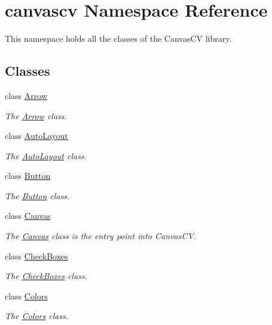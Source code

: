 \hypertarget{namespacecanvascv}{}\section{canvascv Namespace Reference}
\label{namespacecanvascv}


This namespace holds all the classes of the Canvas\+CV library.  


\subsection*{Classes}
\begin{DoxyCompactItemize}
\item 
class \hyperlink{classcanvascv_1_1Arrow}{Arrow}
\begin{DoxyCompactList}\small\item\em The \hyperlink{classcanvascv_1_1Arrow}{Arrow} class. \end{DoxyCompactList}\item 
class \hyperlink{classcanvascv_1_1AutoLayout}{Auto\+Layout}
\begin{DoxyCompactList}\small\item\em The \hyperlink{classcanvascv_1_1AutoLayout}{Auto\+Layout} class. \end{DoxyCompactList}\item 
class \hyperlink{classcanvascv_1_1Button}{Button}
\begin{DoxyCompactList}\small\item\em The \hyperlink{classcanvascv_1_1Button}{Button} class. \end{DoxyCompactList}\item 
class \hyperlink{classcanvascv_1_1Canvas}{Canvas}
\begin{DoxyCompactList}\small\item\em The \hyperlink{classcanvascv_1_1Canvas}{Canvas} class is the entry point into Canvas\+CV. \end{DoxyCompactList}\item 
class \hyperlink{classcanvascv_1_1CheckBoxes}{Check\+Boxes}
\begin{DoxyCompactList}\small\item\em The \hyperlink{classcanvascv_1_1CheckBoxes}{Check\+Boxes} class. \end{DoxyCompactList}\item 
class \hyperlink{classcanvascv_1_1Colors}{Colors}
\begin{DoxyCompactList}\small\item\em The \hyperlink{classcanvascv_1_1Colors}{Colors} class. \end{DoxyCompactList}\item 

\end{DoxyCompactItemize}
